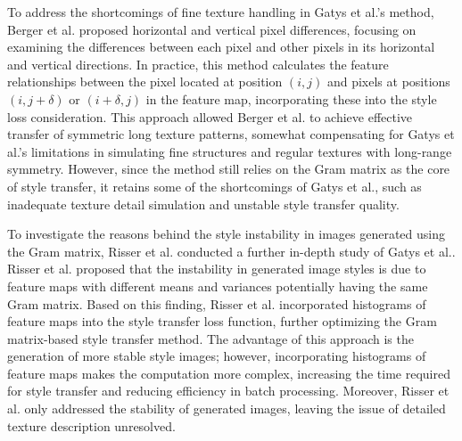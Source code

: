 To address the shortcomings of fine texture handling in Gatys et al.'s method, Berger et al.\citep{26berger2016incorporating} proposed horizontal and vertical pixel differences, focusing on examining the differences between each pixel and other pixels in its horizontal and vertical directions. In practice, this method calculates the feature relationships between the pixel located at position $(i, j)$ and pixels at positions $(i,j+\delta)$ or $(i+\delta,j)$ in the feature map, incorporating these into the style loss consideration. This approach allowed Berger et al.\citep{26berger2016incorporating} to achieve effective transfer of symmetric long texture patterns, somewhat compensating for Gatys et al.'s limitations in simulating fine structures and regular textures with long-range symmetry. However, since the method still relies on the Gram matrix as the core of style transfer, it retains some of the shortcomings of Gatys et al., such as inadequate texture detail simulation and unstable style transfer quality.

To investigate the reasons behind the style instability in images generated using the Gram matrix, Risser et al.\citep{27risser2017stable} conducted a further in-depth study of Gatys et al.\citep{02gatys2016image}. Risser et al. proposed that the instability in generated image styles is due to feature maps with different means and variances potentially having the same Gram matrix. Based on this finding, Risser et al. incorporated histograms of feature maps into the style transfer loss function, further optimizing the Gram matrix-based style transfer method. The advantage of this approach is the generation of more stable style images; however, incorporating histograms of feature maps makes the computation more complex, increasing the time required for style transfer and reducing efficiency in batch processing. Moreover, Risser et al. only addressed the stability of generated images, leaving the issue of detailed texture description unresolved.


